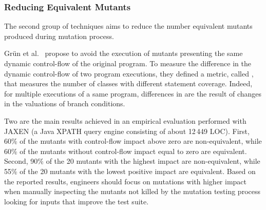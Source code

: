 \subsubsection{Reducing Equivalent Mutants}
The second group of techniques aims to reduce the number equivalent mutants produced during mutation process.

Gr\"{u}n et al.~\cite{grun2009impact} propose to avoid the execution of mutants presenting the same dynamic control-flow of the original program.
To measure the difference in the dynamic control-flow of two program executions, they defined a metric, called , that measures
the number of classes with different statement coverage.
Indeed, for multiple executions of a same program, differences in  are the result of changes in the valuations of branch conditions.

Two are the main results achieved in an empirical evaluation performed with JAXEN (a Java XPATH query engine consisting of about 12\,449 LOC). 
First, 60\% of the mutants with control-flow impact above zero are non-equivalent, while 60\% of the mutants without control-flow impact equal to zero are equivalent. 
Second, 90\% of the 20 mutants with the highest impact are non-equivalent, while 55\% of the 20 mutants with the lowest positive impact are equivalent. 
Based on the reported results, engineers should focus on mutations with higher impact when manually inspecting the mutants not killed by the mutation testing process looking for inputs that improve the test suite.

